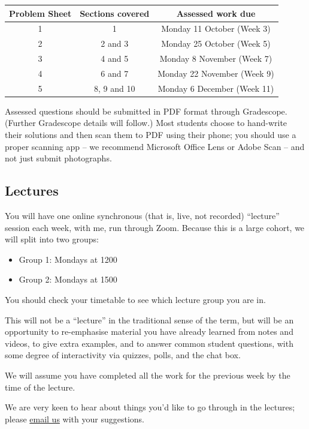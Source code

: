 \documentclass[
  a4paper,
]{book}
\providecommand{\tightlist}{%
  \setlength{\itemsep}{0pt}\setlength{\parskip}{0pt}}
\theoremstyle{definition}
\theoremstyle{definition}
\theoremstyle{definition}
\theoremstyle{definition}
\theoremstyle{remark}
\begin{document}
\begin{longtable}[]{@{}ccc@{}}
\toprule
Problem Sheet & Sections covered & Assessed work due \\
\midrule
\endhead
1 & 1 & Monday 11 October (Week 3) \\
2 & 2 and 3 & Monday 25 October (Week 5) \\
3 & 4 and 5 & Monday 8 November (Week 7) \\
4 & 6 and 7 & Monday 22 November (Week 9) \\
5 & 8, 9 and 10 & Monday 6 December (Week 11) \\
\bottomrule
\end{longtable}

Assessed questions should be submitted in PDF format through Gradescope. (Further Gradescope details will follow.) Most students choose to hand-write their solutions and then scan them to PDF using their phone; you should use a proper scanning app -- we recommend Microsoft Office Lens or Adobe Scan -- and not just submit photographs.

\hypertarget{lectures}{%
\subsection*{Lectures}\label{lectures}}

You will have one online synchronous (that is, live, not recorded) ``lecture'' session each week, with me, run through Zoom. Because this is a large cohort, we will split into two groups:

\begin{itemize}
\tightlist
\item
  Group 1: Mondays at 1200
\item
  Group 2: Mondays at 1500
\end{itemize}

You should check your timetable to see which lecture group you are in.

This will not be a ``lecture'' in the traditional sense of the term, but will be an opportunity to re-emphasise material you have already learned from notes and videos, to give extra examples, and to answer common student questions, with some degree of interactivity via quizzes, polls, and the chat box.

We will assume you have completed all the work for the previous week by the time of the lecture.

We are very keen to hear about things you'd like to go through in the lectures; please \href{mailto:math1710@leeds.ac.uk}{email us} with your suggestions.
\end{document}
